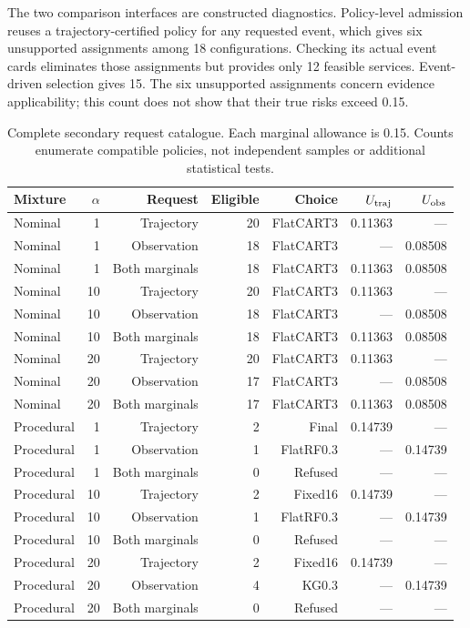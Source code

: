 The two comparison interfaces are constructed diagnostics. Policy-level admission reuses a trajectory-certified policy for any requested event, which gives six unsupported assignments among 18 configurations. Checking its actual event cards eliminates those assignments but provides only 12 feasible services. Event-driven selection gives 15. The six unsupported assignments concern evidence applicability; this count does not show that their true risks exceed 0.15.
\begin{table}[!htbp]\centering\footnotesize
\caption{Complete secondary request catalogue. Each marginal allowance is 0.15. Counts enumerate compatible policies, not independent samples or additional statistical tests.}\label{supp:dispatchcatalogue}
\begin{tabular}{@{}lrrrrrr@{}}\toprule
Mixture & $\alpha$ & Request & Eligible & Choice & $U_{\rm traj}$ & $U_{\rm obs}$\\\midrule
Nominal & 1 & Trajectory & 20 & FlatCART3 & 0.11363 & ---\\
Nominal & 1 & Observation & 18 & FlatCART3 & --- & 0.08508\\
Nominal & 1 & Both marginals & 18 & FlatCART3 & 0.11363 & 0.08508\\
Nominal & 10 & Trajectory & 20 & FlatCART3 & 0.11363 & ---\\
Nominal & 10 & Observation & 18 & FlatCART3 & --- & 0.08508\\
Nominal & 10 & Both marginals & 18 & FlatCART3 & 0.11363 & 0.08508\\
Nominal & 20 & Trajectory & 20 & FlatCART3 & 0.11363 & ---\\
Nominal & 20 & Observation & 17 & FlatCART3 & --- & 0.08508\\
Nominal & 20 & Both marginals & 17 & FlatCART3 & 0.11363 & 0.08508\\
Procedural & 1 & Trajectory & 2 & Final & 0.14739 & ---\\
Procedural & 1 & Observation & 1 & FlatRF0.3 & --- & 0.14739\\
Procedural & 1 & Both marginals & 0 & Refused & --- & ---\\
Procedural & 10 & Trajectory & 2 & Fixed16 & 0.14739 & ---\\
Procedural & 10 & Observation & 1 & FlatRF0.3 & --- & 0.14739\\
Procedural & 10 & Both marginals & 0 & Refused & --- & ---\\
Procedural & 20 & Trajectory & 2 & Fixed16 & 0.14739 & ---\\
Procedural & 20 & Observation & 4 & KG0.3 & --- & 0.14739\\
Procedural & 20 & Both marginals & 0 & Refused & --- & ---\\
\bottomrule\end{tabular}\end{table}
